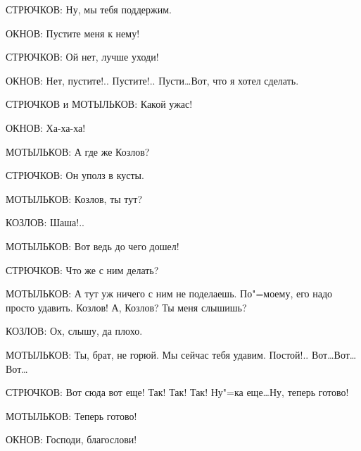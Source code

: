 СТРЮЧКОВ: Ну, мы тебя поддержим.
    
ОКНОВ: Пустите меня к нему!
    
СТРЮЧКОВ: Ой нет, лучше уходи!
    
ОКНОВ: Нет, пустите!.. Пустите!.. Пусти\dots Вот, что я хотел сделать.
    
СТРЮЧКОВ и МОТЫЛЬКОВ: Какой ужас!
    
ОКНОВ: Ха-ха-ха!
    
МОТЫЛЬКОВ: А где же Козлов?
    
СТРЮЧКОВ: Он уполз в кусты.
    
МОТЫЛЬКОВ: Козлов, ты тут?
    
КОЗЛОВ: Шаша!..
    
МОТЫЛЬКОВ: Вот ведь до чего дошел!
    
СТРЮЧКОВ: Что же с ним делать?
    
МОТЫЛЬКОВ: А тут уж ничего с ним не поделаешь. По"=моему, его надо просто удавить. Козлов! А, Козлов? Ты меня слышишь?
    
КОЗЛОВ: Ох, слышу, да плохо.
    
МОТЫЛЬКОВ: Ты, брат, не горюй. Мы сейчас тебя удавим. Постой!.. Вот\dots Вот\dots Вот\dots
    
СТРЮЧКОВ: Вот сюда вот еще! Так! Так! Так! Ну"=ка еще\dots Ну, теперь готово!
    
МОТЫЛЬКОВ: Теперь готово!
    
ОКНОВ: Господи, благослови!